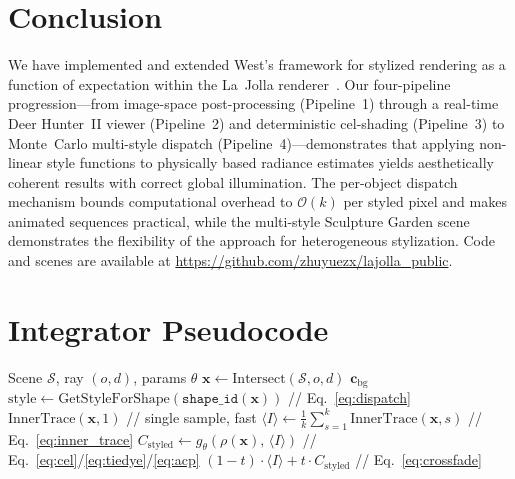 \documentclass{article}
\begin{document}
\section{Conclusion}
\label{sec:conclusion}

We have implemented and extended West's framework for stylized rendering as a function of expectation within the La~Jolla renderer~\cite{li2018differentiable}. Our four-pipeline progression---from image-space post-processing (Pipeline~1) through a real-time Deer Hunter~II viewer (Pipeline~2) and deterministic cel-shading (Pipeline~3) to Monte~Carlo multi-style dispatch (Pipeline~4)---demonstrates that applying non-linear style functions to physically based radiance estimates yields aesthetically coherent results with correct global illumination. The per-object dispatch mechanism bounds computational overhead to $\mathcal{O}(k)$ per styled pixel and makes animated sequences practical, while the multi-style Sculpture Garden scene demonstrates the flexibility of the approach for heterogeneous stylization. Code and scenes are available at \url{https://github.com/zhuyuezx/lajolla_public}.





\newpage
\appendix

\section{Integrator Pseudocode}
\label{app:pseudocode}

\begin{algorithm}[h]
\caption{Stylized Path Tracing with Per-Object Dispatch (Pipeline~4)}
\label{alg:stylized_pt}
\begin{algorithmic}[1]
\REQUIRE Scene $\mathcal{S}$, ray $(o, d)$, params $\theta$
\STATE $\mathbf{x} \leftarrow \text{Intersect}(\mathcal{S}, o, d)$
    \RETURN $\mathbf{c}_{\text{bg}}$
\ENDIF
\STATE $\text{style} \leftarrow \text{GetStyleForShape}(\texttt{shape\_id}(\mathbf{x}))$ \hfill {\footnotesize // Eq.~\ref{eq:dispatch}}
    \RETURN $\text{InnerTrace}(\mathbf{x}, 1)$ \hfill {\footnotesize // single sample, fast}
\ENDIF
\STATE $\langle I \rangle \leftarrow \frac{1}{k}\sum_{s=1}^{k} \text{InnerTrace}(\mathbf{x}, s)$ \hfill {\footnotesize // Eq.~\ref{eq:inner_trace}}
\STATE $C_{\text{styled}} \leftarrow g_\theta(\rho(\mathbf{x}),\, \langle I \rangle)$ \hfill {\footnotesize // Eq.~\ref{eq:cel}/\ref{eq:tiedye}/\ref{eq:acp}}
\RETURN $(1 - t) \cdot \langle I \rangle + t \cdot C_{\text{styled}}$ \hfill {\footnotesize // Eq.~\ref{eq:crossfade}}
\end{algorithmic}
\end{algorithm}
\end{document}
